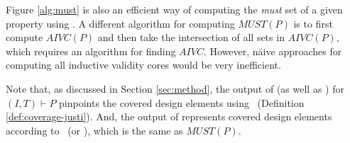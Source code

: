 Figure \ref{alg:must} is also an efficient way of computing the \emph{must} set of a given property using \ucalg. A different algorithm for computing $MUST (P)$ is to first compute $AIVC (P)$ and then take the intersection of all sets in $AIVC (P)$, which requires an algorithm for finding $AIVC$.  However, n{\"a}ive approaches for computing all inductive validity cores would be very inefficient.

Note that, as discussed in Section \ref{sec:method}, the
output of \ucalg (as well as \ucbfalg) for $(I, T) \vdash P$ pinpoints the covered design elements
using \ivccov\ (Definition \ref{def:coverage-justi}).
And, the output of \mustalg represents covered design elements according to \nondetcovalt\ (or \nondetcov ), which is the same as $MUST(P)$.
%


